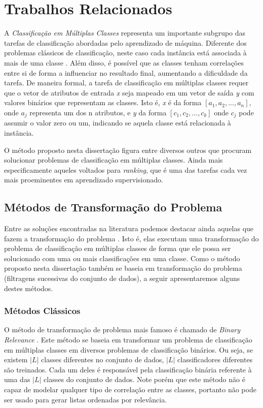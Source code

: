 \chapter{Trabalhos Relacionados}
\label{chap:trabalhosrelacionados}

A \textit{Classificação em Múltiplas Classes} representa um importante subgrupo das tarefas de classificação abordadas pelo aprendizado de máquina.
Diferente dos problemas clássicos de classificação, neste caso cada instância está associada à mais de uma classe \cite{Tsoumakas}.
Além disso, é possível que as classes tenham correlações entre si de forma a influenciar no resultado final, aumentando a dificuldade da tarefa.
De maneira formal, a tarefa de classificação em múltiplas classes requer que o vetor de atributos de entrada \textit{x} seja mapeado em um vetor de saída \textit{y} com valores binários que representam as classes.
Isto é, \textit{x} é da forma $[a_1, a_2, ..., a_n]$, onde $a_j$ representa um dos n atributos, e \textit{y} da forma $[c_1, c_2, ... , c_k]$ onde $c_j$ pode assumir o valor zero ou um, indicando se aquela classe está relacionada à instância.  

O método proposto nesta dissertação figura entre diversos outros que procuram solucionar problemas de classificação em múltiplas classes.
Ainda mais especificamente aqueles voltados para \textit{ranking}, que é uma das tarefas cada vez mais proeminentes em aprendizado supervisionado.

\section{Métodos de Transformação do Problema}

Entre as soluções encontradas na literatura podemos destacar ainda aquelas que fazem a transformação do problema \cite{Tsoumakas}.
Isto é, elas executam uma transformação do problema de classificação em múltiplas classes de forma que ele possa ser solucionado com uma ou mais classificações em uma classe.
Como o método proposto nesta dissertação também se baseia em transformação do problema (filtragens sucessivas do conjunto de dados), a seguir apresentaremos alguns destes métodos.

\subsection{Métodos Clássicos}

O método de transformação de problema mais famoso é chamado de \textit{Binary Relevance} \cite{Tsoumakas, Godbole, Zhang}.
Este método se baseia em transformar um problema de classificação em múltiplas classes em diversos problemas de classificação binários.
Ou seja, se existem $\vert L \vert$ classes diferentes no conjunto de dados, $\vert L \vert$ classificadores diferentes são treinados.
Cada um deles é responsável pela classificação binária referente à uma das $\vert L \vert$ classes do conjunto de dados.
Note porém que este método não é capaz de modelar qualquer tipo de correlação entre as classes, portanto não pode ser usado para gerar listas ordenadas por relevância.

